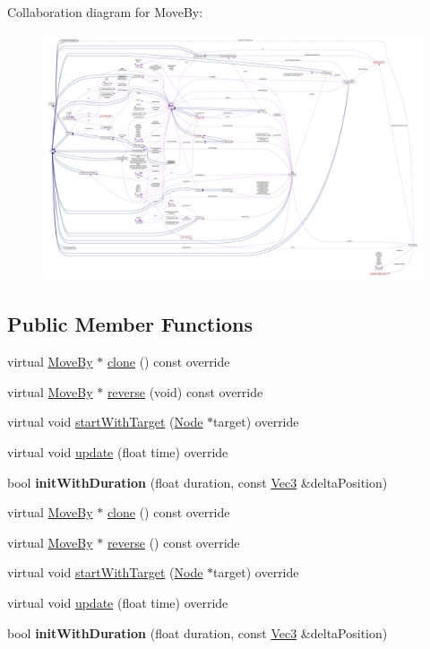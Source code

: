 Collaboration diagram for Move\+By\+:
\nopagebreak
\begin{figure}[H]
\begin{center}
\leavevmode
\includegraphics[width=350pt]{classMoveBy__coll__graph}
\end{center}
\end{figure}
\subsection*{Public Member Functions}
\begin{DoxyCompactItemize}
\item 
virtual \hyperlink{classMoveBy}{Move\+By} $\ast$ \hyperlink{classMoveBy_a56e7a18b9eb4a9c106bac223103f937f}{clone} () const override
\item 
virtual \hyperlink{classMoveBy}{Move\+By} $\ast$ \hyperlink{classMoveBy_a3a29609f88b72d383c31e122693185f7}{reverse} (void) const override
\item 
virtual void \hyperlink{classMoveBy_ab83e2fe86e82757fa11cb734a4971a5f}{start\+With\+Target} (\hyperlink{classNode}{Node} $\ast$target) override
\item 
virtual void \hyperlink{classMoveBy_afabf897627fba061a80ab8121840347e}{update} (float time) override
\item 
\mbox{\label{classMoveBy_ab610144edc349ff0fa2a9fe88ff067c1}} 
bool {\bfseries init\+With\+Duration} (float duration, const \hyperlink{classVec3}{Vec3} \&delta\+Position)
\item 
virtual \hyperlink{classMoveBy}{Move\+By} $\ast$ \hyperlink{classMoveBy_a61bec7fdd7e48d0388627f1e348ab450}{clone} () const override
\item 
virtual \hyperlink{classMoveBy}{Move\+By} $\ast$ \hyperlink{classMoveBy_a5b1077bc56798449c06f216572345a5b}{reverse} () const override
\item 
virtual void \hyperlink{classMoveBy_a1eb16a340ada5b0256772c6ca3a97bea}{start\+With\+Target} (\hyperlink{classNode}{Node} $\ast$target) override
\item 
virtual void \hyperlink{classMoveBy_aa068073d0de5b7b9e731c44f71362c9b}{update} (float time) override
\item 
\mbox{\label{classMoveBy_ab610144edc349ff0fa2a9fe88ff067c1}} 
bool {\bfseries init\+With\+Duration} (float duration, const \hyperlink{classVec3}{Vec3} \&delta\+Position)
\end{DoxyCompactItemize}
